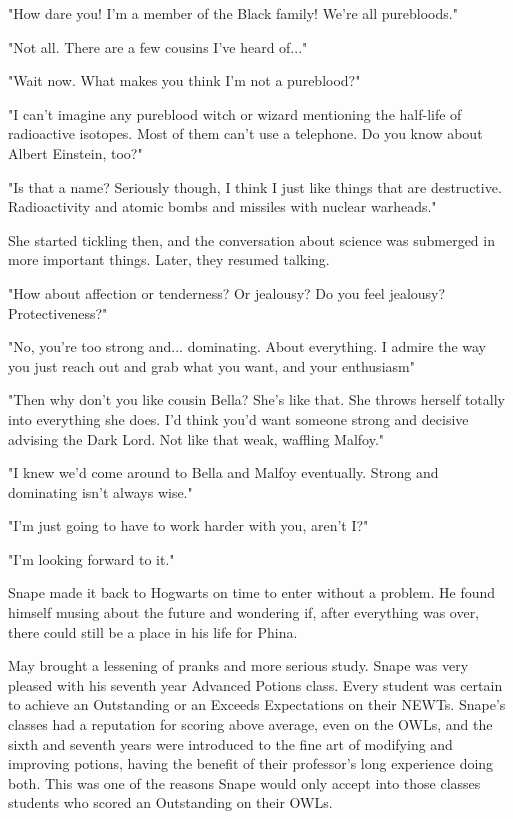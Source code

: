 \documentclass[a4paper,11pt]{article}
\begin{document}
"How dare you! I'm a member of the Black family! We're all purebloods."

"Not all. There are a few cousins I've heard of..."

"Wait now. What makes you think I'm not a pureblood?"

"I can't imagine any pureblood witch or wizard mentioning the half-life of radioactive isotopes. Most of them can't use a telephone. Do you know about Albert Einstein, too?"

"Is that a name? Seriously though, I think I just like things that are destructive. Radioactivity and atomic bombs and missiles with nuclear warheads."

She started tickling then, and the conversation about science was submerged in more important things. Later, they resumed talking.

"How about affection or tenderness? Or jealousy? Do you feel jealousy? Protectiveness?"

"No, you're too strong and... dominating. About everything. I admire the way you just reach out and grab what you want, and your enthusiasm"

"Then why don't you like cousin Bella? She's like that. She throws herself totally into everything she does. I'd think you'd want someone strong and decisive advising the Dark Lord. Not like that weak, waffling Malfoy."

"I knew we'd come around to Bella and Malfoy eventually. Strong and dominating isn't always wise."

"I'm just going to have to work harder with you, aren't I?"

"I'm looking forward to it."

Snape made it back to Hogwarts on time to enter without a problem. He found himself musing about the future and wondering if, after everything was over, there could still be a place in his life for Phina.

May brought a lessening of pranks and more serious study. Snape was very pleased with his seventh year Advanced Potions class. Every student was certain to achieve an Outstanding or an Exceeds Expectations on their NEWTs. Snape's classes had a reputation for scoring above average, even on the OWLs, and the sixth and seventh years were introduced to the fine art of modifying and improving potions, having the benefit of their professor's long experience doing both. This was one of the reasons Snape would only accept into those classes students who scored an Outstanding on their OWLs.
\end{document}
